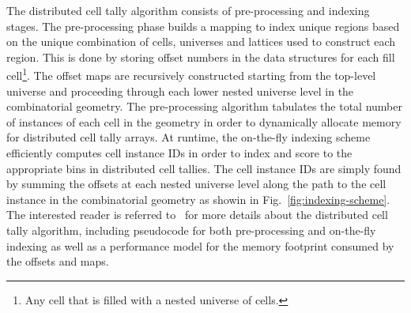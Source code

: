 The distributed cell tally algorithm consists of pre-processing and indexing stages. The pre-processing phase builds a mapping to index unique regions based on the unique combination of cells, universes and lattices used to construct each region. This is done by storing offset numbers in the data structures for each fill cell\footnote{Any cell that is filled with a nested universe of cells.}. The offset maps are recursively constructed starting from the top-level universe and proceeding through each lower nested universe level in the combinatorial geometry. The pre-processing algorithm tabulates the total number of instances of each cell in the geometry in order to dynamically allocate memory for distributed cell tally arrays. At runtime, the on-the-fly indexing scheme efficiently computes cell instance IDs in order to index and score to the appropriate bins in distributed cell tallies. The cell instance IDs are simply found by summing the offsets at each nested universe level along the path to the cell instance in the combinatorial geometry as showin in Fig.~\ref{fig:indexing-scheme}. The interested reader is referred to~\cite{lax2014distribcell} for more details about the distributed cell tally algorithm, including pseudocode for both pre-processing and on-the-fly indexing as well as a performance model for the memory footprint consumed by the offsets and maps.
  
